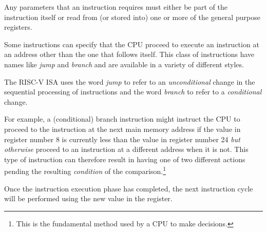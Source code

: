 Any parameters that an instruction requires must either be part of 
the instruction itself or read from (or stored into) one or more of the 
general purpose registers.

Some instructions can specify that the CPU proceed to execute an
instruction at an address other than the one that follows itself.
This class of instructions have names like {\em jump} and {\em branch}
and are available in a variety of different styles.

The RISC-V ISA uses the word {\em jump} to refer to an {\em unconditional}
change in the sequential processing of instructions and the word
{\em branch} to refer to a {\em conditional} change.

For example, a (conditional) branch instruction might instruct the CPU 
to proceed to the instruction at the next main memory address if the value 
in register number 8 is currently less than the value in register number 
24 {\em but otherwise} proceed to an instruction at a different address
when it is not.  This type of instruction can therefore result in having 
one of two different actions pending the resulting {\em condition} of 
the comparison.\footnote{This is the fundamental method used by a CPU 
to make decisions.}

Once the instruction execution phase has completed, the next instruction 
cycle will be performed using the new value in the  register.
